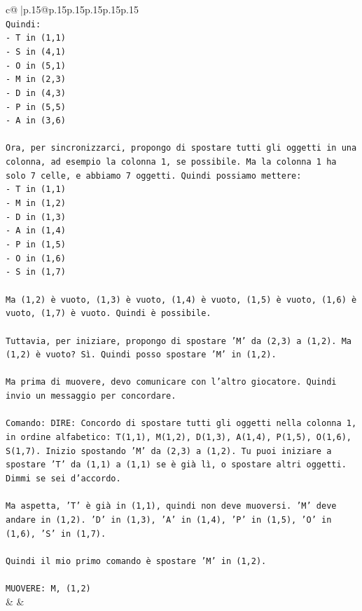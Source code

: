 \documentclass{article}
\begin{document}
{\begin{supertabular}{c@{$\;$}|p{.15\linewidth}@{}p{.15\linewidth}p{.15\linewidth}p{.15\linewidth}p{.15\linewidth}p{.15\linewidth}}
{{{\\ 
\texttt{Quindi:} \\
\texttt{{-} T in (1,1)} \\
\texttt{{-} S in (4,1)} \\
\texttt{{-} O in (5,1)} \\
\texttt{{-} M in (2,3)} \\
\texttt{{-} D in (4,3)} \\
\texttt{{-} P in (5,5)} \\
\texttt{{-} A in (3,6)} \\
\\ 
\texttt{Ora, per sincronizzarci, propongo di spostare tutti gli oggetti in una colonna, ad esempio la colonna 1, se possibile. Ma la colonna 1 ha solo 7 celle, e abbiamo 7 oggetti. Quindi possiamo mettere:} \\
\texttt{{-} T in (1,1)} \\
\texttt{{-} M in (1,2)} \\
\texttt{{-} D in (1,3)} \\
\texttt{{-} A in (1,4)} \\
\texttt{{-} P in (1,5)} \\
\texttt{{-} O in (1,6)} \\
\texttt{{-} S in (1,7)} \\
\\ 
\texttt{Ma (1,2) è vuoto, (1,3) è vuoto, (1,4) è vuoto, (1,5) è vuoto, (1,6) è vuoto, (1,7) è vuoto. Quindi è possibile.} \\
\\ 
\texttt{Tuttavia, per iniziare, propongo di spostare 'M' da (2,3) a (1,2). Ma (1,2) è vuoto? Sì. Quindi posso spostare 'M' in (1,2).} \\
\\ 
\texttt{Ma prima di muovere, devo comunicare con l'altro giocatore. Quindi invio un messaggio per concordare.} \\
\\ 
\texttt{Comando: DIRE: Concordo di spostare tutti gli oggetti nella colonna 1, in ordine alfabetico: T(1,1), M(1,2), D(1,3), A(1,4), P(1,5), O(1,6), S(1,7). Inizio spostando 'M' da (2,3) a (1,2). Tu puoi iniziare a spostare 'T' da (1,1) a (1,1) se è già lì, o spostare altri oggetti. Dimmi se sei d'accordo.} \\
\\ 
\texttt{Ma aspetta, 'T' è già in (1,1), quindi non deve muoversi. 'M' deve andare in (1,2). 'D' in (1,3), 'A' in (1,4), 'P' in (1,5), 'O' in (1,6), 'S' in (1,7).} \\
\\ 
\texttt{Quindi il mio primo comando è spostare 'M' in (1,2).} \\
\\ 
\texttt{MUOVERE: M, (1,2)} \\
            }
        }
    }
    & & \\ \\


\end{supertabular}}
\end{document}
